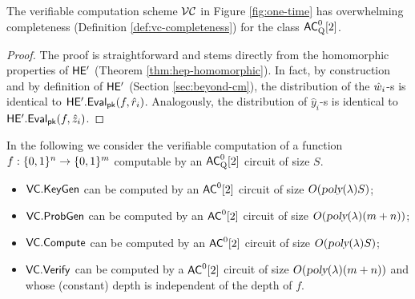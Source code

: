 \begin{lemma}[Completeness of $\VC$]
The verifiable computation scheme $\VC$ in Figure \ref{fig:one-time} has overwhelming completeness (Definition \ref{def:vc-completeness}) for the class ${\mathsf{AC}}^0_{\text{Q}}[2]$.
\end{lemma}
\begin{proof}
The proof is straightforward and stems directly from the homomorphic properties of $\mathsf{HE'}$ (Theorem \ref{thm:hep-homomorphic}).
In fact, by construction and by definition of $\mathsf{HE'}$ (Section \ref{sec:beyond-cm}), the distribution of the $\hat{w}_i$-s is identical to $\mathsf{HE'.Eval}_{\mathsf{pk}}(f, \hat{r}_i)$. Analogously, the distribution of $\hat{y}_i$-s is identical to $\mathsf{HE'.Eval}_{\mathsf{pk}}(f, \hat{z}_i)$.
\end{proof}


\begin{remark}[Efficiency of $\VC$]
In the following we consider the verifiable computation of a function $f: \{0, 1\}^n \to \{0, 1\}^m$ computable by an ${\mathsf{AC}}^0_{\text{Q}}[2]$ circuit of size $S$.
\begin{itemize}
\item  $\mathsf{VC.KeyGen}$ can be computed by an ${\mathsf{AC}}^0[2]$ circuit of size $O({\textsl{poly}}(\lambda)S)$; 
\item $\mathsf{VC.ProbGen}$ can be computed by an ${\mathsf{AC}}^0[2]$ circuit of size $O({\textsl{poly}}(\lambda)(m+n))$;
\item $\mathsf{VC.Compute}$ can be computed by an ${\mathsf{AC}}^0[2]$ circuit of size $O({\textsl{poly}}(\lambda)S)$; 
\item $\mathsf{VC.Verify}$ can be computed by a ${\mathsf{AC}}^0[2]$ circuit of size $O({\textsl{poly}}(\lambda)(m+n))$ and whose (constant) depth is independent of the depth of $f$.
\end{itemize}
\end{remark}

